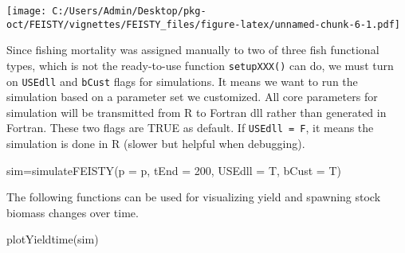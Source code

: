 \documentclass[
]{article}
\newenvironment{Shaded}{\begin{snugshade}}{\end{snugshade}}
\newcommand{\AttributeTok}[1]{\textcolor[rgb]{0.77,0.63,0.00}{#1}}
\newcommand{\CommentTok}[1]{\textcolor[rgb]{0.56,0.35,0.01}{\textit{#1}}}
\newcommand{\ConstantTok}[1]{\textcolor[rgb]{0.00,0.00,0.00}{#1}}
\newcommand{\DecValTok}[1]{\textcolor[rgb]{0.00,0.00,0.81}{#1}}
\newcommand{\FunctionTok}[1]{\textcolor[rgb]{0.00,0.00,0.00}{#1}}
\newcommand{\NormalTok}[1]{#1}
\newcommand{\OtherTok}[1]{\textcolor[rgb]{0.56,0.35,0.01}{#1}}
\newcommand{\SpecialCharTok}[1]{\textcolor[rgb]{0.00,0.00,0.00}{#1}}
\newcommand{\StringTok}[1]{\textcolor[rgb]{0.31,0.60,0.02}{#1}}
\begin{document}
\begin{Shaded}
\end{Shaded}

\texttt{[image: C:/Users/Admin/Desktop/pkg-oct/FEISTY/vignettes/FEISTY\_files/figure-latex/unnamed-chunk-6-1.pdf]}

Since fishing mortality was assigned manually to two of three fish
functional types, which is not the ready-to-use function
\texttt{setupXXX()} can do, we must turn on \texttt{USEdll} and
\texttt{bCust} flags for simulations. It means we want to run the
simulation based on a parameter set we customized. All core parameters
for simulation will be transmitted from R to Fortran dll rather than
generated in Fortran. These two flags are TRUE as default. If
\texttt{USEdll\ =\ F}, it means the simulation is done in R (slower but
helpful when debugging).

\begin{Shaded}
\begin{Highlighting}[]
\NormalTok{sim}\OtherTok{=}\FunctionTok{simulateFEISTY}\NormalTok{(}\AttributeTok{p =}\NormalTok{ p, }\AttributeTok{tEnd =} \DecValTok{200}\NormalTok{, }\AttributeTok{USEdll =}\NormalTok{ T, }\AttributeTok{bCust =}\NormalTok{ T)}
\end{Highlighting}
\end{Shaded}

The following functions can be used for visualizing yield and spawning
stock biomass changes over time.

\begin{Shaded}
\begin{Highlighting}[]
\FunctionTok{plotYieldtime}\NormalTok{(sim)}
\end{Highlighting}
\end{Shaded}
\end{document}
